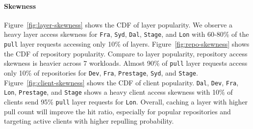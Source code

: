 \paragraph{Skewness}
Figure~\ref{fig:layer-skewness} shows the CDF of layer popularity.
We observe a heavy layer access skewness for \texttt{Fra}, \texttt{Syd}, \texttt{Dal}, \texttt{Stage}, and \texttt{Lon} with 60-80\%  of the \texttt{pull} layer requests accessing only 10\% of layers.
Figure~\ref{fig:repo-skewness} shows the CDF of repository popularity.
Compare to layer popularity, 
repository access skewness is heavier across 7 workloads.
Almost 90\% of \texttt{pull} layer requests access only 10\% of repositories for 
\texttt{Dev}, \texttt{Fra}, \texttt{Prestage}, \texttt{Syd}, and \texttt{Stage}.
Figure~\ref{fig:client-skewness} shows the CDF of client popularity.
\texttt{Dal}, \texttt{Dev}, \texttt{Fra}, \texttt{Lon}, \texttt{Prestage}, and \texttt{Stage} shows a heavy client access skewness with
10\% of clients send 95\% \texttt{pull} layer requests for \texttt{Lon}.
Overall, caching a layer with higher pull count will improve the hit ratio, 
especially for popular repositories and targeting active clients with higher repulling probability.

